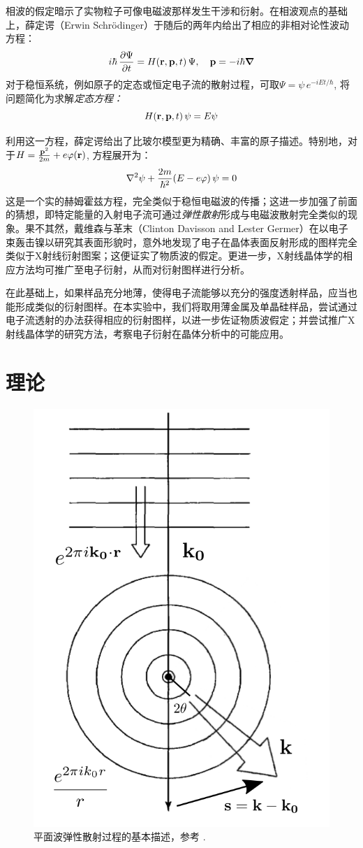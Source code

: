 \documentclass[aps,pre,12pt,preprint,%
	onecolumn,showpacs,showkeys,nofootinbib]{revtex4-2}
\begin{document}
	相波的假定暗示了实物粒子可像电磁波那样发生干涉和衍射。在相波观点的基础上，薛定谔（Erwin Schrödinger）于随后的两年内给出了相应的非相对论性波动方程：
	\begin{equation}
		i\hbar\,\pdv{\Psi}{t} = H\pqty{\vb{r},\vb{p},t}\,\Psi,\quad
		\vb{p} = -i\hbar\grad
	\end{equation}
	对于稳恒系统，例如原子的定态或恒定电子流的散射过程，可取$\Psi = \psi\,e^{-iEt/\hbar}$, 将问题简化为求解\textit{定态方程：}
	\begin{equation}
		H\pqty{\vb{r},\vb{p},t}\,\psi = E\psi
	\end{equation}
	
	利用这一方程，薛定谔给出了比玻尔模型更为精确、丰富的原子描述。特别地，对于$H = \frac{\vb{p}^2}{2m} + e\varphi(\vb{r})$, 方程展开为：
	\begin{equation}
		\laplacian{\psi}
			+ \frac{2m}{\hbar^2} \pqty{E - e\varphi}\,\psi = 0
	\end{equation}
	这是一个实的赫姆霍兹方程，完全类似于稳恒电磁波的传播；这进一步加强了前面的猜想，即特定能量的入射电子流可通过\textit{弹性散射}形成与电磁波散射完全类似的现象。果不其然，戴维森与革末（Clinton Davisson and Lester Germer）在以电子束轰击镍以研究其表面形貌时，意外地发现了电子在晶体表面反射形成的图样完全类似于X射线衍射图案\supercite{davisson1927diffraction}；这便证实了物质波的假定。更进一步，X射线晶体学的相应方法均可推广至电子衍射，从而对衍射图样进行分析。
	
	在此基础上，如果样品充分地薄，使得电子流能够以充分的强度透射样品，应当也能形成类似的衍射图样。在本实验中，我们将取用薄金属及单晶硅样品，尝试通过电子流透射的办法获得相应的衍射图样，以进一步佐证物质波假定；并尝试推广X射线晶体学的研究方法，考察电子衍射在晶体分析中的可能应用。\vspace{3ex}
\section{理论}
	\begin{figure}[!h]
	\centering\vspace{-1\baselineskip}
	\includegraphics[width=.5\linewidth]{Scattering.png}
	\caption{平面波弹性散射过程的基本描述，参考 \cite{griffiths2016introduction}. }
	\end{figure}
	
\end{document}
